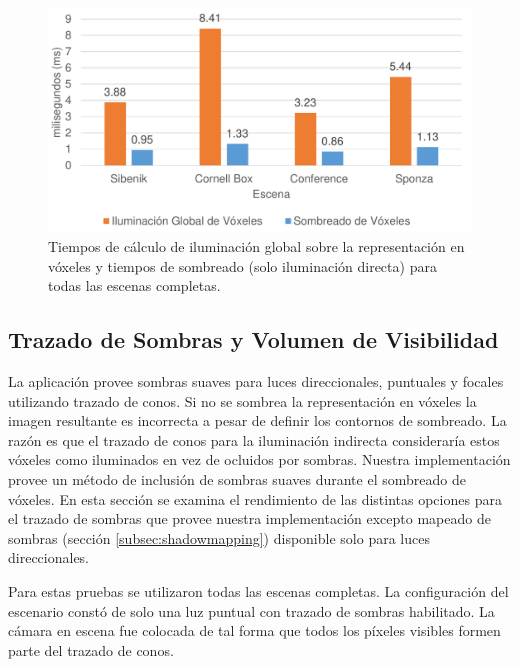
\begin{figure}[H]
	\centering
	\includegraphics[width=0.8\linewidth]{media/voxel_gi_time_cropped.pdf}
	\caption{Tiempos de cálculo de iluminación global sobre la representación en vóxeles y tiempos de sombreado (solo iluminación directa) para todas las escenas completas.}
	\label{fig:gi_voxel_time}
\end{figure}

\subsection{Trazado de Sombras y Volumen de Visibilidad}

La aplicación provee sombras suaves para luces direccionales, puntuales y focales utilizando trazado de conos. Si no se sombrea la representación en vóxeles la imagen resultante es incorrecta a pesar de definir los contornos de sombreado. La razón es que el trazado de conos para la iluminación indirecta consideraría estos vóxeles como iluminados en vez de ocluidos por sombras. Nuestra implementación provee un método de inclusión de sombras suaves durante el sombreado de vóxeles. En esta sección se examina el rendimiento de las distintas opciones para el trazado de sombras que provee nuestra implementación excepto mapeado de sombras (sección \ref{subsec:shadowmapping}) disponible solo para luces direccionales.

Para estas pruebas se utilizaron todas las escenas completas. La configuración del escenario constó de solo una luz puntual con trazado de sombras habilitado. La cámara en escena fue colocada de tal forma que todos los píxeles visibles formen parte del trazado de conos. 

